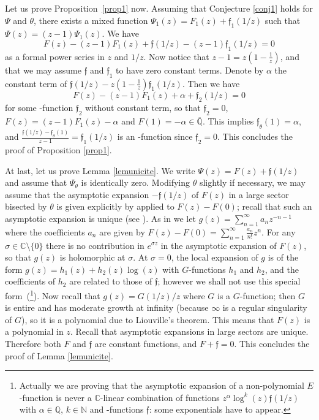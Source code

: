 \documentclass[reqno,12pt]{article}
\numberwithin{equation}{section}
\theoremstyle{remark}
\newcommand{\N}{\mathbb{N}}
\newcommand{\Q}{\mathbb{Q}}
\providecommand{\C}{}\renewcommand{\C}{\mathbb{C}}
\newcommand{\Qbar}{\overline{\mathbb Q}}
\newcommand{\tantie}{{\fontencoding{OT2}\fontfamily{wncyr}\selectfont\CYREREV}}
\newcommand{\antie}{\text{\tantie}}
\newcommand{\fgo}{\mathfrak{f}}
\begin{document}
\bigskip

Let us prove Proposition~\ref{prop1} now.  Assuming that Conjecture \ref{conj1} holds for $\Psi$ and $\theta$, there exists a mixed function $ \Psi_1(z)=F_1(z)+\fgo_1(1/z)$ such that $ \Psi(z) =(z-1)\Psi_1(z)$. 
We have
\begin{equation}\label{eqpreuvelem}
 F(z)-(z-1) F_1(z)+  \fgo (1/z) - (z-1)  \fgo_{1} (1/z)  = 0
 \end{equation}
as a formal power series in $z$ and $1/z$.
 Now notice that $z-1 = z(1-\frac1z)$, and  that we may assume   $\fgo $ and $\fgo_{1 }$ to have zero constant terms.
Denote by $\alpha $ the constant term of  $ \fgo (1/z) -  z(1-\frac1z) \fgo_{1}(1/z)$. Then we have 
$$  F(z)-(z-1) F_1(z)+ \alpha + \fgo_{2}(1/z)  =0$$
for some  \antie-function $\fgo_{2}$  without constant term, so that $\fgo_{2 } = 0$,  $ F(z) = (z-1) F_1(z)-  \alpha $ and $F(1) = -  \alpha\in\Qbar$.  This implies $\fgo_\theta(1) =   \alpha$, and  $\frac{  \fgo(1/z)  - \fgo_\theta(1) }{z-1}  =\fgo_{1 } (1/z) $ is an \antie-function since $\fgo_{2 } = 0$.
This  concludes the proof of Proposition \ref{prop1}.


\bigskip

At last, let us prove Lemma \ref{lemunicite}.
 We write  $\Psi(z) = F(z)+\fgo(1/z)$ and assume that $\Psi_\theta$ is identically zero.
Modifying $\theta$ slightly if necessary, we may assume that the asymptotic expansion $-\fgo(1/z)$ of $F(z)$ in a  large sector bisected by $\theta$ is given explicitly by \cite[Theorem~5]{ateo} applied to $F(z)-F(0)$; recall that such an asymptotic expansion is unique (see   \cite{ateo}). As in \cite{ateo} we let $g(z) = \sum_{n=1}^\infty a_n z^{-n-1}$ where the coefficients $a_n$ are given by $F(z)-F(0)= \sum_{n=1}^\infty \frac{a_n}{n!} z^n$.   For any $\sigma \in \C \setminus \{  0 \}$ there is no contribution in $e^{\sigma z}$ in the asymptotic expansion of $F(z)$, so that $g(z)$ is holomorphic at $\sigma$. At $\sigma=0$, the local expansion of $g$ is of the form $g(z) = h_1(z) +  h_2(z)\log(z)$ with $G$-functions $h_1$ and $h_2$, and  the coefficients of $h_2$ are related to those of $\fgo$; however we shall not use this special form~(\footnote{Actually we are proving that the asymptotic expansion of a non-polynomial $E$-function is never a $\C$-linear combination of functions $z^\alpha \log^k(z) \fgo(1/z)$ with $\alpha\in\Q$, $k\in\N$ and \antie-functions $\fgo$: some exponentials have to appear.}). Now recall that $g(z) = G(1/z)/z$ where $G$ is a $G$-function; then $G$ is entire and   has moderate growth at infinity (because $\infty$ is a regular singularity of $G$), so  it is a polynomial due to Liouville's theorem. This means that $F(z)$ is a polynomial in $z$. Recall that  asymptotic expansions in large sectors are unique. Therefore both $F$ and  $\fgo   $ are  constant functions, and $F+\fgo=0$. This concludes the proof of Lemma \ref{lemunicite}.
 
\end{document}
